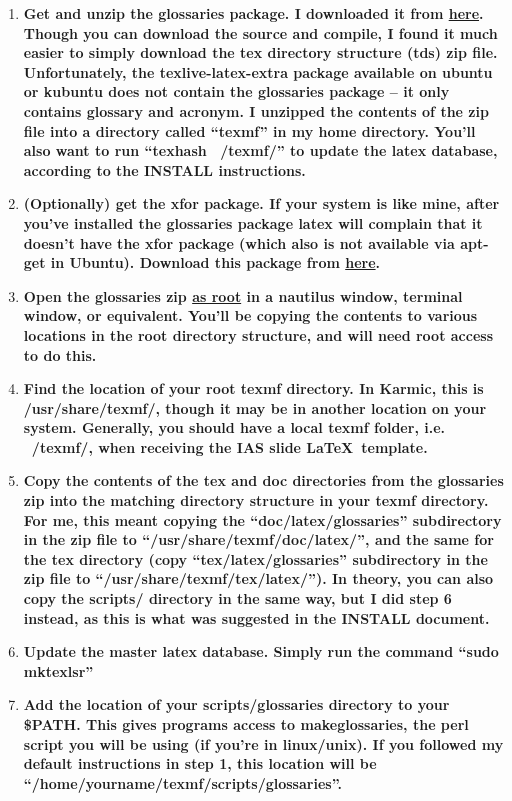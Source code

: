 		\begin{enumerate}
			\item \bf{Get and unzip the glossaries package.} I downloaded it from \href{http://www.tex.ac.uk/tex-archive/install/macros/latex/contrib/glossaries.tds.zip}{here}. Though you can download the source and compile, I found it much easier to simply download the tex directory structure (tds) zip file.  Unfortunately, the texlive-latex-extra package available on ubuntu or kubuntu does not contain the glossaries package – it only contains glossary and acronym. I unzipped the contents of the zip file into a directory called “texmf” in my home directory. You’ll also want to run “texhash ~/texmf/” to update the latex database, according to the INSTALL instructions. %
			\item \bf{(Optionally) get the xfor package.} If your system is like mine, after you’ve installed the glossaries package latex will complain that it doesn’t have the xfor package (which also is not available via apt-get in Ubuntu). Download this package from \href{http://tug.ctan.org/tex-archive/macros/latex/contrib/xfor/}{here}. %
			\item \bf{Open the glossaries zip \ul{as root} in a nautilus window, terminal window, or equivalent.} You’ll be copying the contents to various locations in the root directory structure, and will need root access to do this. %
			\item \bf{Find the location of your root texmf directory.} In Karmic, this is /usr/share/texmf/, though it may be in another location on your system. Generally, you should have a local texmf folder, i.e. ~/texmf/, when receiving the IAS slide \LaTeX~template. %
			\item \bf{Copy the contents of the tex and doc directories from the glossaries zip into the matching directory structure in your texmf directory.} For me, this meant copying the “doc/latex/glossaries” subdirectory in the zip file to “/usr/share/texmf/doc/latex/”, and the same for the tex directory (copy “tex/latex/glossaries” subdirectory in the zip file to “/usr/share/texmf/tex/latex/”). In theory, you can also copy the scripts/ directory in the same way, but I did step 6 instead, as this is what was suggested in the INSTALL document.
			\item \bf{Update the master latex database.} Simply run the command “sudo mktexlsr”
			\item \bf{Add the location of your scripts/glossaries directory to your \$PATH.} This gives programs access to makeglossaries, the perl script you will be using (if you’re in linux/unix). If you followed my default instructions in step 1, this location will be “/home/yourname/texmf/scripts/glossaries”.

\end{enumerate}
